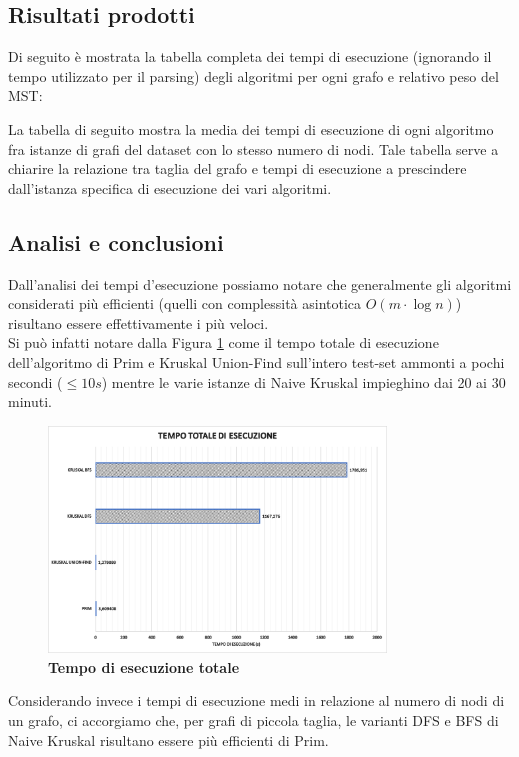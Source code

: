 \documentclass[]{article}
\begin{document}
\subsection{Risultati prodotti}
\begin{flushleft}
Di seguito è mostrata la tabella completa dei tempi di esecuzione (ignorando il tempo utilizzato per il parsing) degli algoritmi per ogni grafo e relativo peso del MST: 


La tabella di seguito mostra la media dei tempi di esecuzione di ogni algoritmo fra istanze di grafi del dataset con lo stesso numero di nodi. Tale tabella serve a chiarire la relazione tra taglia del grafo e tempi di esecuzione a prescindere dall'istanza specifica di esecuzione dei vari algoritmi.

\newpage
\subsection{Analisi e conclusioni}
Dall'analisi dei tempi d'esecuzione possiamo notare che generalmente gli algoritmi considerati più efficienti (quelli con complessità asintotica $O(m\cdot\log n)$) risultano essere effettivamente i più veloci.\\
Si può infatti notare dalla Figura \ref{total} come il tempo totale di esecuzione dell'algoritmo di Prim e Kruskal Union-Find sull'intero test-set ammonti a pochi secondi ($\leq 10 s$) mentre le varie istanze di Naive Kruskal impieghino dai 20 ai 30 minuti.
\begin{figure}[H]
	\centering
	\includegraphics[width=0.8\textwidth,height=\textheight,keepaspectratio]{grafo_costo_totale.png}
	\caption{\textbf{Tempo di esecuzione totale}}
	\label{total}
\end{figure}
Considerando invece i tempi di esecuzione medi in relazione al numero di nodi di un grafo, ci accorgiamo che, per grafi di piccola taglia, le varianti DFS e BFS di Naive Kruskal risultano essere più efficienti di Prim.\\

\end{flushleft}
\end{document}
